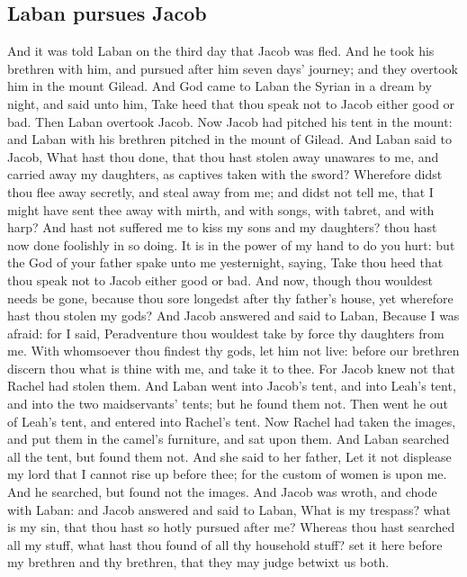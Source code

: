 \begin{biblechapter}
\section*{Laban pursues Jacob}
\verse And it was told Laban on the third day that Jacob was fled.
\verse And he took his brethren with him, and pursued after him seven days' journey; and they overtook him in the mount Gilead.
\verse And God came to Laban the Syrian in a dream by night, and said unto him, Take heed that thou speak not to Jacob either good or bad.
\verse Then Laban overtook Jacob. Now Jacob had pitched his tent in the mount: and Laban with his brethren pitched in the mount of Gilead.
\verse And Laban said to Jacob, What hast thou done, that thou hast stolen away unawares to me, and carried away my daughters, as captives taken with the sword?
\verse Wherefore didst thou flee away secretly, and steal away from me; and didst not tell me, that I might have sent thee away with mirth, and with songs, with tabret, and with harp?
\verse And hast not suffered me to kiss my sons and my daughters? thou hast now done foolishly in so doing.
\verse It is in the power of my hand to do you hurt: but the God of your father spake unto me yesternight, saying, Take thou heed that thou speak not to Jacob either good or bad.
\verse And now, though thou wouldest needs be gone, because thou sore longedst after thy father's house, yet wherefore hast thou stolen my gods?
\verse And Jacob answered and said to Laban, Because I was afraid: for I said, Peradventure thou wouldest take by force thy daughters from me.
\verse With whomsoever thou findest thy gods, let him not live: before our brethren discern thou what is thine with me, and take it to thee. For Jacob knew not that Rachel had stolen them.
\verse And Laban went into Jacob's tent, and into Leah's tent, and into the two maidservants' tents; but he found them not. Then went he out of Leah's tent, and entered into Rachel's tent.
\verse Now Rachel had taken the images, and put them in the camel's furniture, and sat upon them. And Laban searched all the tent, but found them not.
\verse And she said to her father, Let it not displease my lord that I cannot rise up before thee; for the custom of women is upon me. And he searched, but found not the images.
\verse And Jacob was wroth, and chode with Laban: and Jacob answered and said to Laban, What is my trespass? what is my sin, that thou hast so hotly pursued after me?
\verse Whereas thou hast searched all my stuff, what hast thou found of all thy household stuff? set it here before my brethren and thy brethren, that they may judge betwixt us both.

\end{biblechapter}
